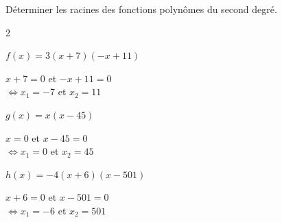 \documentclass[12pt,a4paper]{article}  %
\begin{document}
\begin{center}

\end{center}


%
%
\vspace{.05cm} 

\vspace*{-0.5cm}

Déterminer les racines des fonctions polynômes du second degré.
\begin{multicols}{2}
\begin{enumMet}
    \item $f(x)=3(x+7)(-x+11)$ \\
    \begin{corrBox}
    	$x+7=0$ et $-x+11=0$\\
    	$\iff x_1=-7$ et $x_2=11$
    \end{corrBox}
    \item $g(x)=x(x-45)$ \\
    \begin{corrBox}
    	$x=0$ et $x-45=0$\\
    	$\iff x_1=0$ et $x_2=45$
    \end{corrBox}
	\columnbreak
    \item $h(x)=-4(x+6)(x-501)$ \\
    \begin{corrBox}
    	$ x+6=0$ et $x-501=0$\\
    	$\iff x_1=-6$ et $x_2=501$
    \end{corrBox}
\end{enumMet}
\end{multicols}
\end{document}
